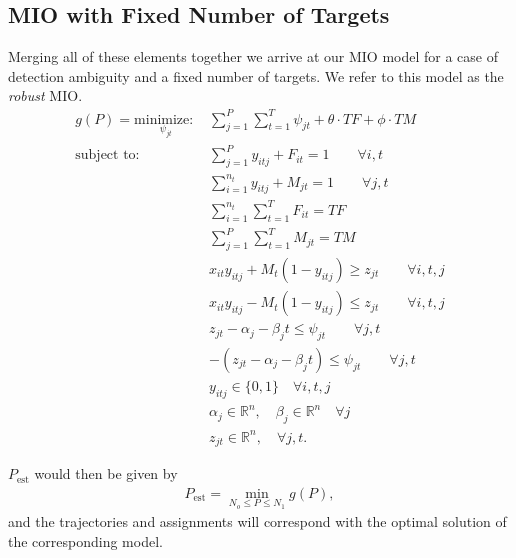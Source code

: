 \subsection{MIO with Fixed Number of Targets}
Merging all of these elements together we arrive at our MIO model for a case of detection ambiguity and a fixed number of targets. We refer to this model as the \textit{robust} MIO. 
\begin{align}
g(P)=\underset{\psi_{jt}}{\text{minimize: }} & \sum_{j=1}^{P} \sum_{t=1}^{T} \psi_{jt} + \theta \cdot TF + \phi \cdot TM \label{eq:simple_robust}\\
\text{subject to: }	& \sum_{j=1}^{P} y_{itj} + F_{it} = 1 \qquad \forall i,t \nonumber \\
				& \sum_{i=1}^{n_{t}} y_{itj} + M_{jt} = 1 \qquad \forall j,t \nonumber\\
				& \sum_{i=1}^{n_{t}} \sum_{t=1}^{T} F_{it} = TF \nonumber \\
				& \sum_{j=1}^{P} \sum_{t=1}^{T} M_{jt} = TM \nonumber \\
				& x_{it}y_{itj} + M_{t}(1-y_{itj}) \geq z_{jt} \qquad \forall i,t,j \nonumber \\
				& x_{it}y_{itj} - M_{t}(1-y_{itj}) \leq z_{jt} \qquad \forall i,t,j \nonumber \\
				& z_{jt} - \alpha_{j} - \beta_{j}t \leq \psi_{jt} \qquad \forall j,t \nonumber \\
				& -(z_{jt} - \alpha_{j} - \beta_{j}t) \leq \psi_{jt} \qquad \forall j,t \nonumber \\
				& y_{itj} \in \{0,1\} \quad \forall i,t,j \nonumber \\
				& \alpha_{j} \in \mathbb{R}^n,\quad \beta_{j} \in \mathbb{R}^n \quad \forall j \nonumber\\
				& z_{jt} \in \mathbb{R}^n, \quad \forall j,t. \nonumber
\end{align}

$P_\text{est}$ would then be given by
\begin{align}P_\text{est}=\min_{N_o\leq P\leq N_1} g(P),\end{align}
and the trajectories and assignments will correspond with the optimal solution of the corresponding model.

